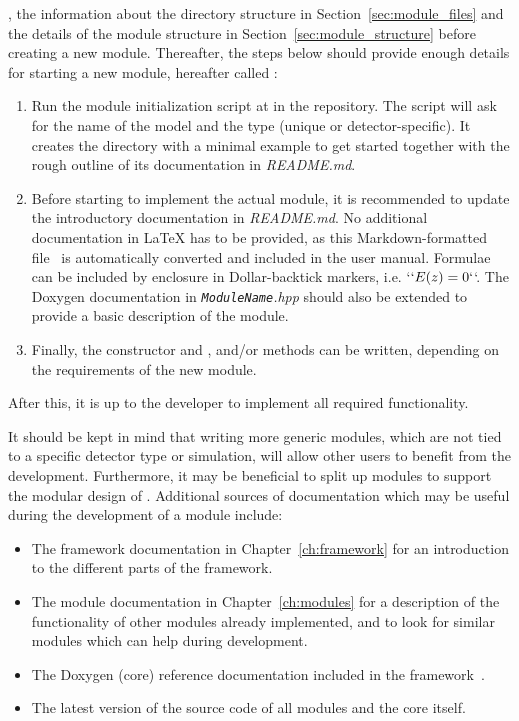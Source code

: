 , the information about the directory structure in Section~\ref{sec:module_files} and the details of the module structure in Section~\ref{sec:module_structure} before creating a new module.
Thereafter, the steps below should provide enough details for starting a new module, hereafter called :
\begin{enumerate}
    \item Run the module initialization script at  in the repository.
    The script will ask for the name of the model and the type (unique or detector-specific).
    It creates the directory with a minimal example to get started together with the rough outline of its documentation in \textit{README.md}.
    \item Before starting to implement the actual module, it is recommended to update the introductory documentation in \textit{README.md}.
    No additional documentation in LaTeX has to be provided, as this Markdown-formatted file~\cite{markdown} is automatically converted and included in the user manual.
    Formulae can be included by enclosure in Dollar-backtick markers, i.e. `$` E(z) = 0`$`.
    The Doxygen documentation in \textit{\texttt{ModuleName}.hpp} should also be extended to provide a basic description of the module.
    \item Finally, the constructor and ,  and/or  methods can be written, depending on the requirements of the new module.
\end{enumerate}

After this, it is up to the developer to implement all required functionality.

It should be kept in mind that writing more generic modules, which are not tied to a specific detector type or simulation, will allow other users to benefit from the development.
Furthermore, it may be beneficial to split up modules to support the modular design of \apsq.
Additional sources of documentation which may be useful during the development of a module include:
\begin{itemize}
\item The framework documentation in Chapter~\ref{ch:framework} for an introduction to the different parts of the framework.
\item The module documentation in Chapter~\ref{ch:modules} for a description of the functionality of other modules already implemented, and to look for similar modules which can help during development.
\item The Doxygen (core) reference documentation included in the framework~\cite{ap2-doxygen}.
\item The latest version of the source code of all modules and the \apsq core itself.
\end{itemize}

